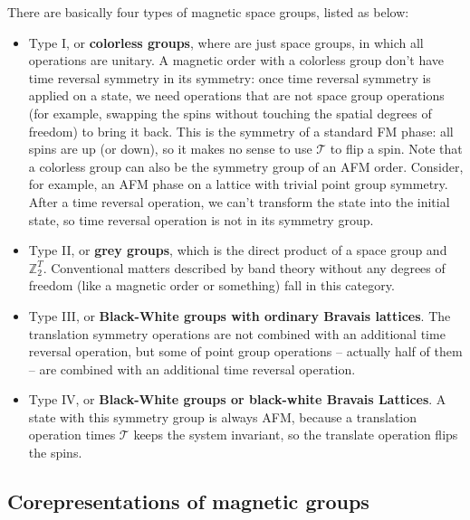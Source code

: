 \documentclass[hyperref, a4paper]{article}
\newcommand*{\concept}[1]{{\textbf{#1}}}
\begin{document}
There are basically four types of magnetic space groups, listed as below:
\begin{itemize}
    \item Type I, or \concept{colorless groups}, where are just space groups, in which all operations are 
    unitary. A magnetic order with a colorless group don't have time reversal symmetry in its symmetry: 
    once time reversal symmetry is applied on a state, 
    we need operations that are not space group operations 
    (for example, swapping the spins without touching the spatial degrees of freedom)
    to bring it back. 
    This is the symmetry of a standard FM phase: all spins 
    are up (or down), so it makes no sense to use $\mathcal{T}$ to flip a spin. 
    Note that a colorless group can also be the symmetry group of an AFM order. Consider, for example, 
    an AFM phase on a lattice with trivial point group symmetry. After a time reversal operation, we can't 
    transform the state into the initial state, so time reversal operation is not in its symmetry group. 
    \item Type II, or \concept{grey groups}, which is the direct product of a space group and $\mathbb{Z}_2^T$.
    Conventional matters described by band theory without any degrees of freedom 
    (like a magnetic order or something) fall in this category.
    \item Type III, or \concept{Black-White groups with ordinary Bravais lattices}. The translation symmetry 
    operations are not combined with an additional time reversal operation, 
    but some of point group operations -- actually half of them --
    are combined with an additional time reversal operation. 
    \item Type IV, or \concept{Black-White groups or black-white Bravais Lattices}. A state with this symmetry
    group is always AFM, because a translation operation times $\mathcal{T}$ keeps the system invariant, 
    so the translate operation flips the spins.
\end{itemize}

\subsection{Corepresentations of magnetic groups}
\end{document}
